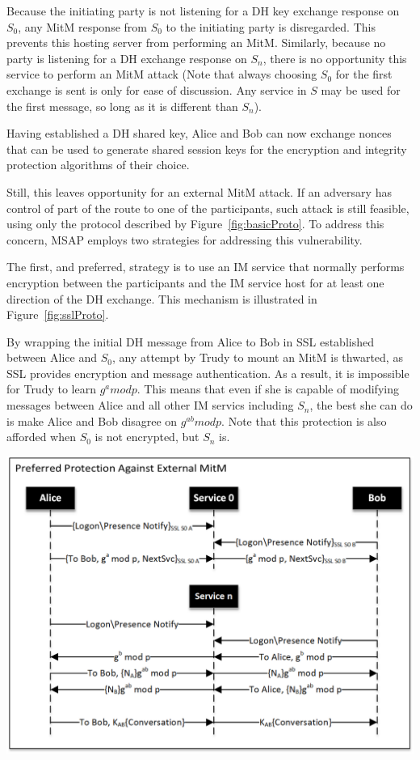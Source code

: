 \documentclass[twoside,10pt]{article}
\newenvironment{Figure}
  {\par\medskip\noindent\minipage{\linewidth}}
  {\endminipage\par\medskip}
\begin{document}
\begin{multicols}{2}
Because the initiating party is not listening for a DH key exchange response on $S_0$, any MitM response from $S_0$ to the initiating party is disregarded.  This prevents this hosting server from performing an MitM.  Similarly, because no party is listening for a DH exchange response on $S_n$, there is no opportunity this service to perform an MitM attack (Note that always choosing $S_0$ for the first exchange is sent is only for ease of discussion.  Any service in $S$ may be used for the first message, so long as it is different than $S_n$).

Having established a DH shared key, Alice and Bob can now exchange nonces that can be used to generate shared session keys for the encryption and integrity protection algorithms of their choice.

Still, this leaves opportunity for an external MitM attack.  If an adversary has control of part of the route to one of the participants, such attack is still feasible, using only the protocol described by Figure~\ref{fig:basicProto}.  To address this concern, MSAP employs two strategies for addressing this vulnerability.

The first, and preferred, strategy is to use an IM service that normally performs encryption between the participants and the IM service host for at least one direction of the DH exchange.  This mechanism is illustrated in Figure~\ref{fig:sslProto}.

By wrapping the initial DH message from Alice to Bob in SSL established between Alice and $S_0$, any attempt by Trudy to mount an MitM is thwarted, as SSL provides encryption and message authentication.  As a result, it is impossible for Trudy to learn $g^a mod p$.  This means that even if she is capable of modifying messages between Alice and all other IM servics including $S_n$, the best she can do is make Alice and Bob disagree on $g^{ab} mod p$.  Note that this protection is also afforded when $S_0$ is not encrypted, but $S_n$ is.

\begin{Figure}
  \centering
  \includegraphics[width=\textwidth]{SSLOnlyDiagramBW.png}
  \label{fig:sslProto}
\end{Figure}


\end{multicols}
\end{document}
